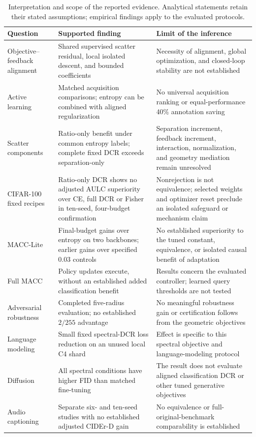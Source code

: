 \documentclass[10pt,a4paper,twocolumn]{article}
\begin{document}
\begin{table}[tbp]
\caption{Interpretation and scope of the reported evidence.
Analytical statements retain their stated assumptions; empirical
findings apply to the evaluated protocols.}
\label{tab:claim_boundaries}
\centering\small
\begin{tabularx}{\textwidth}{@{}p{}YY@{}}
\toprule
Question & Supported finding & Limit of the inference \\
\midrule
Objective--feedback alignment &
Shared supervised scatter residual, local isolated descent, and bounded coefficients &
Necessity of alignment, global optimization, and closed-loop stability are not established \\
Active learning &
Matched acquisition comparisons; entropy can be combined with aligned regularization &
No universal acquisition ranking or equal-performance 40\% annotation saving \\
Scatter components &
Ratio-only benefit under common entropy labels; complete fixed DCR exceeds separation-only &
Separation increment, feedback increment, interaction, normalization, and geometry mediation remain unresolved \\
CIFAR-100 fixed recipes &
Ratio-only DCR shows no adjusted AULC superiority over CE, full DCR or Fisher in ten-seed, four-budget confirmation &
Nonrejection is not equivalence; selected weights and optimizer reset preclude an isolated safeguard or mechanism claim \\
MACC-Lite &
Final-budget gains over entropy on two backbones; earlier gains over specified 0.03 controls &
No established superiority to the tuned constant, equivalence, or isolated causal benefit of adaptation \\
Full MACC &
Policy updates execute, without an established added classification benefit &
Results concern the evaluated controller; learned query thresholds are not tested \\
Adversarial robustness &
Completed five-radius evaluation; no established $2/255$ advantage &
No meaningful robustness gain or certification follows from the geometric objectives \\
Language modeling &
Small fixed spectral-DCR loss reduction on an unused local C4 shard &
Effect is specific to this spectral objective and language-modeling protocol \\
Diffusion &
All spectral conditions have higher FID than matched fine-tuning &
The result does not evaluate aligned classification DCR or other tuned generative objectives \\
Audio captioning &
Separate six- and ten-seed studies with no established adjusted CIDEr-D gain &
No equivalence or full-original-benchmark comparability is established \\
\bottomrule
\end{tabularx}
\end{table}
\end{document}
